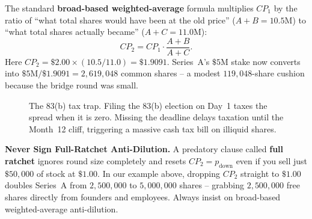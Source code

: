 The standard \textbf{broad-based weighted-average} formula multiplies $CP_1$ by the ratio of ``what total shares would have been at the old price'' ($A + B = 10.5\text{M}$) to ``what total shares actually became'' ($A + C = 11.0\text{M}$):
\begin{equation}\label{eq:broad-based-weighted-average}
  CP_2 = CP_1 \cdot \frac{A + B}{A + C}.
\end{equation}
Here $CP_2 = \$2.00 \times (10.5 / 11.0) = \$1.9091$. Series~A's $\$5\text{M}$ stake now converts into $\$5\text{M} / \$1.9091 = 2{,}619{,}048$ common shares -- a modest $119{,}048$-share cushion because the bridge round was small.

\begin{figure}[htbp]
\centering
{}
\caption{The 83(b) tax trap. Filing the 83(b) election on Day~1 taxes the spread when it is zero. Missing the deadline delays taxation until the Month~12 cliff, triggering a massive cash tax bill on illiquid shares.}
\label{fig:83b-timeline}
\end{figure}

\begin{trapbox}
\textbf{Never Sign Full-Ratchet Anti-Dilution.}
A predatory clause called \textbf{full ratchet} ignores round size completely and resets $CP_2 = p_{\text{down}}$ even if you sell just $\$50{,}000$ of stock at $\$1.00$. In our example above, dropping $CP_2$ straight to $\$1.00$ doubles Series~A from $2{,}500{,}000$ to $5{,}000{,}000$ shares -- grabbing $2{,}500{,}000$ free shares directly from founders and employees. Always insist on broad-based weighted-average anti-dilution.
\end{trapbox}

